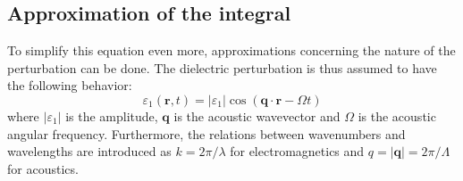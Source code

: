 \documentclass[11pt,twoside]{eitExjobb}
\begin{document}
	\subsection{Approximation of the integral \label{sec:app-derivations-scatter-approx}}
	To simplify this equation even more, approximations concerning the nature of the perturbation can be done. The dielectric perturbation is thus assumed to have the following behavior:
	\begin{equation*}
		\varepsilon_1 (\bm{r},t) = |\varepsilon_1| \cos(\bm{q} \cdot \bm{r} - \Omega t)
	\end{equation*}
	where $|\varepsilon_1|$ is the amplitude, $\bm{q}$ is the acoustic wavevector and $\Omega$ is the acoustic angular frequency. Furthermore, the relations between wavenumbers and wavelengths are introduced as $k = 2\pi/\lambda$ for electromagnetics and $q = |\bm{q}| = 2\pi/\Lambda$ for acoustics.
	
\end{document}

